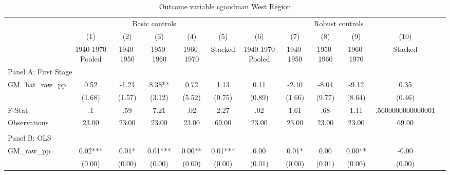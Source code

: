  \begin{table}[htbp]\centering {} \begin{threeparttable} \caption{Outcome variable cgoodman West Region} \begin{tabular}{l*{11}{c}} \toprule
          &\multicolumn{5}{c}{Basic controls}                                   &\multicolumn{5}{c}{Robust controls}                                  \\\cmidrule(lr){2-6}\cmidrule(lr){7-11}
          &\multicolumn{1}{c}{(1)}&\multicolumn{1}{c}{(2)}&\multicolumn{1}{c}{(3)}&\multicolumn{1}{c}{(4)}&\multicolumn{1}{c}{(5)}&\multicolumn{1}{c}{(6)}&\multicolumn{1}{c}{(7)}&\multicolumn{1}{c}{(8)}&\multicolumn{1}{c}{(9)}&\multicolumn{1}{c}{(10)}\\
          &\multicolumn{1}{c}{1940-1970 Pooled}&\multicolumn{1}{c}{1940-1950}&\multicolumn{1}{c}{1950-1960}&\multicolumn{1}{c}{1960-1970}&\multicolumn{1}{c}{Stacked}&\multicolumn{1}{c}{1940-1970 Pooled}&\multicolumn{1}{c}{1940-1950}&\multicolumn{1}{c}{1950-1960}&\multicolumn{1}{c}{1960-1970}&\multicolumn{1}{c}{Stacked}\\
\cmidrule(lr){1-11}
\multicolumn{10}{l}{Panel A: First Stage}\\
\cmidrule(lr){1-11}
GM\_hat\_raw\_pp&      0.52   &     -1.21   &      8.38** &      0.72   &      1.13   &      0.11   &     -2.10   &     -8.04   &     -9.12   &      0.35   \\
          &    (1.68)   &    (1.57)   &    (3.12)   &    (5.52)   &    (0.75)   &    (0.89)   &    (1.66)   &    (9.77)   &    (8.64)   &    (0.46)   \\
\midrule
F-Stat    &        .1   &       .59   &      7.21   &       .02   &      2.27   &       .02   &      1.61   &       .68   &      1.11   &.5600000000000001   \\
Observations&     23.00   &     23.00   &     23.00   &     23.00   &     69.00   &     23.00   &     23.00   &     23.00   &     23.00   &     69.00   \\
\cmidrule[\heavyrulewidth](lr){1-11} \\ \cmidrule[\heavyrulewidth](lr){1-11}
\multicolumn{10}{l}{Panel B: OLS}\\
\cmidrule(lr){1-11}
GM\_raw\_pp &      0.02***&      0.01*  &      0.01***&      0.00** &      0.01***&      0.00   &      0.01*  &      0.00   &      0.00** &     -0.00   \\
          &    (0.00)   &    (0.00)   &    (0.00)   &    (0.00)   &    (0.00)   &    (0.01)   &    (0.00)   &    (0.01)   &    (0.00)   &    (0.00)   \\

\end{tabular}
\end{threeparttable}
\end{table}
